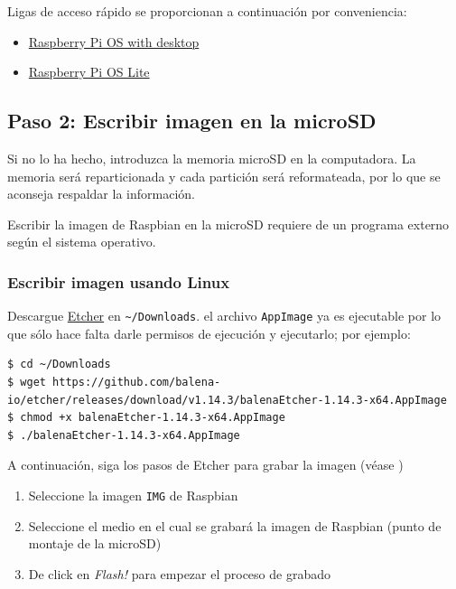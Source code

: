 \documentclass[letterpaper,10.5pt]{article}
\begin{document}
Ligas de acceso rápido se proporcionan a continuación por conveniencia:

\begin{itemize}[noitemsep]
	\item \href{https://downloads.raspberrypi.org/raspios_arm64/images/raspios_arm64-2023-02-22/2023-02-21-raspios-bullseye-arm64.img.xz}{Raspberry Pi OS with desktop}
	\item \href{https://downloads.raspberrypi.org/raspios_lite_arm64/images/raspios_lite_arm64-2023-02-22/2023-02-21-raspios-bullseye-arm64-lite.img.xz}{Raspberry Pi OS Lite}
\end{itemize}

%
%
\subsection{Paso 2: Escribir imagen en la microSD}%
\label{sec:step2}
Si no lo ha hecho, introduzca la memoria microSD en la computadora.
La memoria será reparticionada y cada partición será reformateada, por lo que se aconseja respaldar la información.

Escribir la imagen de Raspbian en la microSD requiere de un programa externo según el sistema operativo.

%
%
\subsubsection{Escribir imagen usando Linux}%
Descargue \href{https://etcher.io/}{Etcher} en \texttt{\textasciitilde/Downloads}.
el archivo \texttt{AppImage} ya es ejecutable por lo que sólo hace falta darle permisos de ejecución y ejecutarlo; por ejemplo:

\begin{Verbatim}[fontsize=\footnotesize]
$ cd ~/Downloads
$ wget https://github.com/balena-io/etcher/releases/download/v1.14.3/balenaEtcher-1.14.3-x64.AppImage
$ chmod +x balenaEtcher-1.14.3-x64.AppImage
$ ./balenaEtcher-1.14.3-x64.AppImage
\end{Verbatim}


A continuación, siga los pasos de Etcher para grabar la imagen (véase )
\begin{enumerate}[noitemsep]
	\item Seleccione la imagen \texttt{IMG} de Raspbian
	\item Seleccione el medio en el cual se grabará la imagen de Raspbian (punto de montaje de la microSD)
	\item De click en \emph{Flash!} para empezar el proceso de grabado
\end{enumerate}
\end{document}
